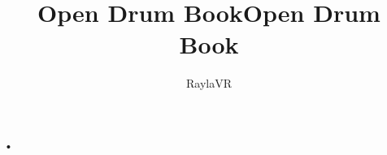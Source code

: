\documentclass[12pt,letterpaper]{book}
\author{RaylaVR}
\title{Open Drum Book}
\begin{document}
•\title{Open Drum Book}
\end{document}
